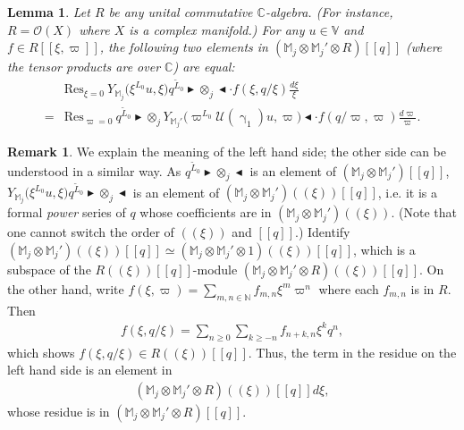 \documentclass[12pt,b5paper,notitlepage]{report}
\theoremstyle{definition}
\newtheorem{rem}[df]{Remark}
\theoremstyle{plain}
\newtheorem{lm}[df]{Lemma}
\newcommand{\mc}{\mathcal}
\newcommand{\wtd}{\widetilde}
\newcommand{\Res}{\mathrm{Res}}
\newcommand{\scr}{\mathscr}
\newcommand{\Vbb}{\mathbb V}
\newcommand{\Mbb}{\mathbb M}
\newcommand{\Cbb}{\mathbb C}
\newcommand{\Nbb}{\mathbb N}
\newcommand{\btl}{\blacktriangleleft}
\newcommand{\btr}{\blacktriangleright}
\numberwithin{equation}{section}
\begin{document}
\begin{lm}\label{lb37}
Let $R$ be any unital commutative $\Cbb$-algebra. (For instance, $R=\scr O(X)$ where $X$ is a complex manifold.) For any $u\in\Vbb$ and $f\in R[[\xi,\varpi]]$, the following two elements in $(\Mbb_j\otimes\Mbb_j'\otimes R)[[q]]$ (where the tensor products are over $\Cbb$) are equal:
\begin{align}
&\Res_{\xi=0}~Y_{\Mbb_j}\big(\xi^{L_0}u,\xi\big)q^{\wtd L_0}\btr\otimes_j\btl\cdot f(\xi,q/\xi)\frac{d\xi}{\xi}\nonumber\\
=&\Res_{\varpi=0}~q^{\wtd L_0}\btr\otimes_j Y_{\Mbb_j'}\big(\varpi^{L_0}\mc U(\upgamma_1)u,\varpi\big)\btl\cdot f(q/\varpi,\varpi)\frac{d\varpi}{\varpi}.\label{eq110}
\end{align}
\end{lm}


\begin{rem}\label{lb38}
We  explain the meaning of the left hand side; the other side can be understood in a similar way. As   $q^{\wtd L_0}\btr\otimes_j\btl$ is an element of $(\Mbb_j\otimes\Mbb_j')[[q]]$, $Y_{\Mbb_j}\big(\xi^{L_0}u,\xi\big)q^{\wtd L_0}\btr\otimes_j\btl$ is an element of $(\Mbb_j\otimes\Mbb_j')((\xi))[[q]]$, i.e. it is a formal \emph{power} series of $q$ whose coefficients are in $(\Mbb_j\otimes\Mbb_j')((\xi))$. (Note that one cannot switch the order of $((\xi))$ and $[[q]]$.) Identify $(\Mbb_j\otimes\Mbb_j')((\xi))[[q]]\simeq (\Mbb_j\otimes\Mbb_j'\otimes 1)((\xi))[[q]]$, which is a subspace of the $R((\xi))[[q]]$-module $(\Mbb_j\otimes\Mbb_j'\otimes R)((\xi))[[q]]$.  On the other hand,  write $f(\xi,\varpi)=\sum_{m,n\in\Nbb}f_{m,n}\xi^m\varpi^n$ where each $f_{m,n}$ is in $R$. Then
\begin{align*}
f(\xi,q/\xi)=\sum_{n\geq 0}\sum_{k\geq -n}f_{n+k,n}\xi^k q^n,
\end{align*}
which shows $f(\xi,q/\xi)\in R((\xi))[[q]]$. Thus, the term in the residue on the left hand side is an element in
\begin{align*}
(\Mbb_j\otimes\Mbb_j'\otimes R)((\xi))[[q]]d\xi,
\end{align*}
whose residue is in $(\Mbb_j\otimes\Mbb_j'\otimes R)[[q]]$.
\end{rem}
\end{document}

